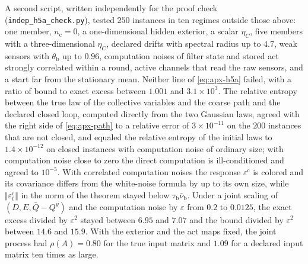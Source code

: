 \begin{numcheck}
A second script, written independently for the proof check (\texttt{indep\_h5a\_check.py}), tested $250$ instances in ten regimes outside those above: one member, $n_{\mathrm c}=0$, a one-dimensional hidden exterior, a scalar $\eta_C$, five members with a three-dimensional $\eta_C$, declared drifts with spectral radius up to $4.7$, weak sensors with $\theta_{\mathrm b}$ up to $0.96$, computation noises of filter state and stored act strongly correlated within a round, active channels that read the raw sensors, and a start far from the stationary mean. Neither line of \cref{eq:apx-h5a} failed, with a ratio of bound to exact excess between $1.001$ and $3.1\times10^3$. The relative entropy between the true law of the collective variables and the coarse path and the declared closed loop, computed directly from the two Gaussian laws, agreed with the right side of \cref{eq:apx-path} to a relative error of $3\times10^{-11}$ on the $200$ instances that are not closed, and equaled the relative entropy of the initial laws to $1.4\times10^{-12}$ on closed instances with computation noise of ordinary size; with computation noise close to zero the direct computation is ill-conditioned and agreed to $10^{-5}$. With correlated computation noises the response $\varepsilon^{\mathrm c}$ is colored and its covariance differs from the white-noise formula by up to its own size, while $\Vert\varepsilon^{\mathrm c}_t\Vert$ in the norm of the theorem stayed below $\tau_{\mathrm b}\bar\nu_{\mathrm b}$. Under a joint scaling of $(D,E,\bar Q-Q^y)$ and the computation noise by $\varepsilon$ from $0.2$ to $0.0125$, the exact excess divided by $\varepsilon^2$ stayed between $6.95$ and $7.07$ and the bound divided by $\varepsilon^2$ between $14.6$ and $15.9$. With the exterior and the act maps fixed, the joint process had $\rho(A)=0.80$ for the true input matrix and $1.09$ for a declared input matrix ten times as large.
\end{numcheck}

